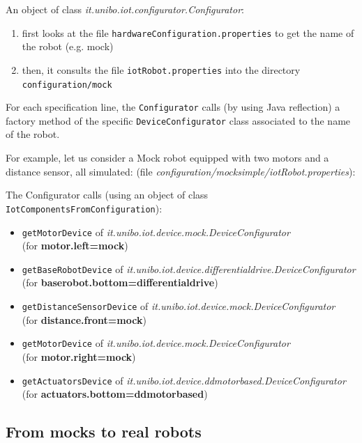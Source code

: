 An object of class \textit{it.unibo.iot.configurator.Configurator}:
\begin{enumerate}
\item first looks at the file \texttt{hardwareConfiguration.properties} to get the name of the robot (e.g. mock)
\item then, it consults the file \texttt{iotRobot.properties} into the directory \texttt{configuration/mock}
\end{enumerate}
 
For each specification line, the \texttt{Configurator} calls (by using Java reflection) a factory method of the specific \texttt{DeviceConfigurator} class associated to the name of the robot.

For example, let us consider a Mock robot equipped with two motors and a distance sensor, all simulated:
(file \textit{configuration/mocksimple/iotRobot.properties}):


The Configurator calls (using an object of class \texttt{IotComponentsFromConfiguration}):
\begin{itemize}
\item \texttt{getMotorDevice} of \textit{it.unibo.iot.device.mock.DeviceConfigurator} \\ (for \textbf{motor.left=mock})
\item \texttt{getBaseRobotDevice} of \textit{it.unibo.iot.device.differentialdrive.DeviceConfigurator} \\(for \textbf{baserobot.bottom=differentialdrive})
\item \texttt{getDistanceSensorDevice} of \textit{it.unibo.iot.device.mock.DeviceConfigurator} \\(for \textbf{distance.front=mock})
\item \texttt{getMotorDevice} of \textit{it.unibo.iot.device.mock.DeviceConfigurator} \\(for \textbf{motor.right=mock})
\item \texttt{getActuatorsDevice} of \textit{it.unibo.iot.device.ddmotorbased.DeviceConfigurator} \\(for \textbf{actuators.bottom=ddmotorbased})
\end{itemize}


\subsection{From mocks to real robots}


